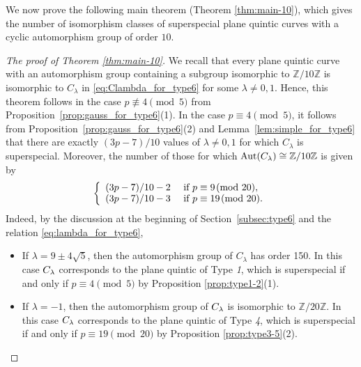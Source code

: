 \documentclass{article}
\theoremstyle{definition}
\begin{document}
We now prove the following main theorem (Theorem \ref{thm:main-10}), which gives the number of isomorphism classes of superspecial plane quintic curves with a cyclic automorphism group of order $10$.\vspace{-1.3mm}
\begin{proof}[The proof of Theorem \ref{thm:main-10}]
We recall that every plane quintic curve with an automorphism group containing a subgroup isomorphic to $\mathbb{Z}/10\mathbb{Z}$ is isomorphic to $C_\lambda$ in \eqref{eq:Clambda_for_type6} for some $\lambda \neq 0,1$.
Hence, this theorem follows in the case $p \not\equiv 4 \pmod{5}$ from Proposition~\ref{prop:gauss_for_type6}(1).
In the case $p \equiv 4 \pmod{5}$, it follows from Proposition~\ref{prop:gauss_for_type6}(2) and Lemma~\ref{lem:simple_for_type6} that there are exactly $(3p-7)/10$ values of $\lambda \neq 0,1$ for which $C_\lambda$ is superspecial.
Moreover, the number of those for which $\hspace{-0.2mm}{\rm Aut}(C_\lambda) \cong \mathbb{Z}/10\mathbb{Z}$ is given by\vspace{-0.7mm}
\begin{equation}\label{eq:number_of_type6}
    \left\{
        \begin{array}{ll}
            (3p-7)/10-2 & \text{ if } p\equiv 9 \!\!\pmod{20},\\[-0.2mm]
            (3p-7)/10-3 & \text{ if } p\equiv 19 \!\!\pmod{20}.
        \end{array}
    \right.\vspace{-0.8mm}
\end{equation}
Indeed, by the discussion at the beginning of Section~\ref{subsec:type6} and the relation \eqref{eq:lambda_for_type6},\vspace{-1.1mm}
\begin{itemize}
    \item If $\lambda = 9 \pm 4\sqrt{5}$, then the automorphism group of $C_\lambda$ has order 150.
    In this case $C_\lambda\hspace{-0.1mm}$ corresponds to the plane quintic of Type \textit{1}, which is superspecial if and only if $p \equiv 4 \pmod{5}$ by Proposition \ref{prop:type1-2}(1).\vspace{-1.6mm}
    \item If $\lambda = -1$, then the automorphism group of $C_\lambda\hspace{-0.1mm}$ is isomorphic to $\mathbb{Z}/20\mathbb{Z}$.
    In this case $C_\lambda\hspace{-0.1mm}$ corresponds to the plane quintic of Type \textit{4}, which is superspecial if and only if $p \equiv 19 \pmod{20}$ by Proposition \ref{prop:type3-5}(2).\vspace{-1.6mm}

\end{itemize}
\end{proof}
\end{document}
